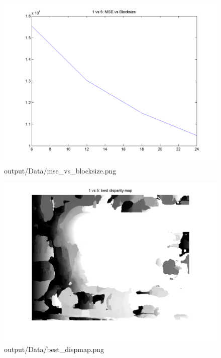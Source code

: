 \begin{figure}[h]    \includegraphics[scale=0.5]{output/Data/mse_vs_blocksize.png}    \caption{output/Data/mse\_vs\_blocksize.png}\end{figure}
\begin{figure}[h]    \includegraphics[scale=0.5]{output/Data/best_dispmap.png}    \caption{output/Data/best\_dispmap.png}\end{figure}
